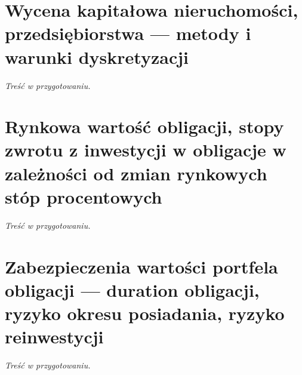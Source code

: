 \documentclass[12pt,a4paper]{report}
\begin{document}
\section[Wycena nieruchomości i przedsiębiorstwa]{Wycena kapitałowa nieruchomości, przedsiębiorstwa --- metody i warunki dyskretyzacji}
\textit{Treść w przygotowaniu.}

\section[Wartość obligacji a stopy procentowe]{Rynkowa wartość obligacji, stopy zwrotu z inwestycji w obligacje w zależności od zmian rynkowych stóp procentowych}
\textit{Treść w przygotowaniu.}

\section[Zabezpieczanie portfela obligacji: duration, ryzyka]{Zabezpieczenia wartości portfela obligacji --- duration obligacji, ryzyko okresu posiadania, ryzyko reinwestycji}
\textit{Treść w przygotowaniu.}
\end{document}
